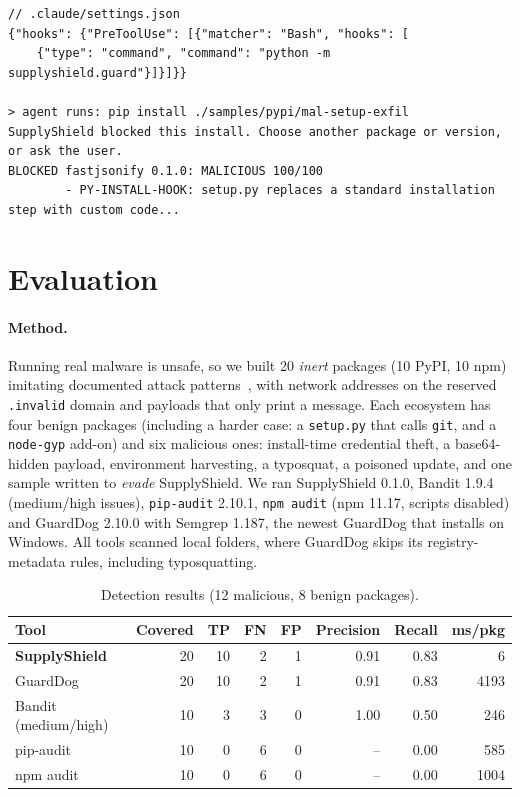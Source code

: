 \documentclass[runningheads]{llncs}
\begin{document}
\begin{lstlisting}[caption={Placing SupplyShield in front of an AI coding agent's install commands.},label={lst:hook}]
// .claude/settings.json
{"hooks": {"PreToolUse": [{"matcher": "Bash", "hooks": [
    {"type": "command", "command": "python -m supplyshield.guard"}]}]}}

> agent runs: pip install ./samples/pypi/mal-setup-exfil
SupplyShield blocked this install. Choose another package or version, or ask the user.
BLOCKED fastjsonify 0.1.0: MALICIOUS 100/100
        - PY-INSTALL-HOOK: setup.py replaces a standard installation step with custom code...
\end{lstlisting}

\section{Evaluation}\label{sec:eval}

\paragraph{Method.} Running real malware is unsafe, so we built 20 \emph{inert} packages (10 PyPI, 10 npm) imitating documented attack patterns~\cite{ohm2020backstabber}, with network addresses on the reserved \texttt{.invalid} domain and payloads that only print a message. Each ecosystem has four benign packages (including a harder case: a \texttt{setup.py} that calls \texttt{git}, and a \texttt{node-gyp} add-on) and six malicious ones: install-time credential theft, a base64-hidden payload, environment harvesting, a typosquat, a poisoned update, and one sample written to \emph{evade} SupplyShield. We ran SupplyShield 0.1.0, Bandit 1.9.4 (medium/high issues), \texttt{pip-audit} 2.10.1, \texttt{npm audit} (npm 11.17, scripts disabled) and GuardDog 2.10.0 with Semgrep 1.187, the newest GuardDog that installs on Windows. All tools scanned local folders, where GuardDog skips its registry-metadata rules, including typosquatting.

\begin{table}[t]
\centering
\caption{Detection results (12 malicious, 8 benign packages).}
\label{tab:results}
\setlength{\tabcolsep}{4pt}
\begin{tabular}{lrrrrrrr}
\toprule
Tool & Covered & TP & FN & FP & Precision & Recall & ms/pkg \\
\midrule
\textbf{SupplyShield} & 20 & 10 & 2 & 1 & 0.91 & 0.83 & 6 \\
GuardDog & 20 & 10 & 2 & 1 & 0.91 & 0.83 & 4193 \\
Bandit (medium/high) & 10 & 3 & 3 & 0 & 1.00 & 0.50 & 246 \\
pip-audit & 10 & 0 & 6 & 0 & -- & 0.00 & 585 \\
npm audit & 10 & 0 & 6 & 0 & -- & 0.00 & 1004 \\
\bottomrule
\end{tabular}
\end{table}
\end{document}
